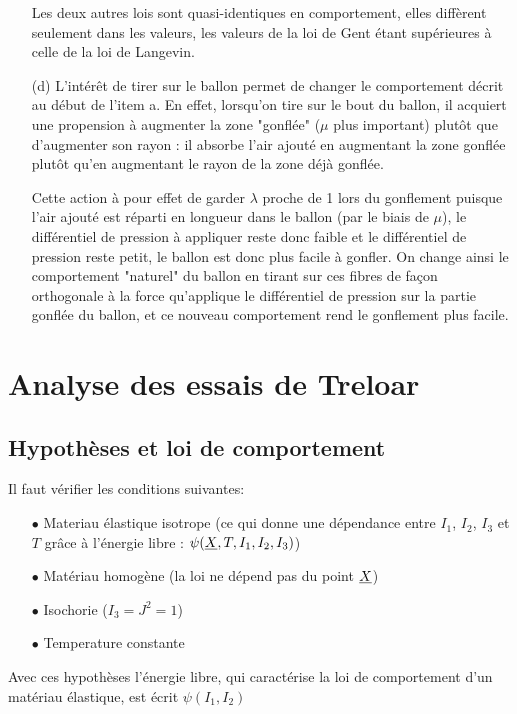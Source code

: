 \documentclass[a4paper,11pt]{article}
\begin{document}
\begin{enumerate}
\hspace{0.8cm}Les deux autres lois sont quasi-identiques en comportement, elles diffèrent seulement dans les valeurs, les valeurs de la loi de Gent étant supérieures à celle de la loi de Langevin.

\item[(d)]
L'intérêt de tirer sur le ballon permet de changer le comportement décrit au début de l'item a. En effet, lorsqu'on tire sur le bout du ballon, il acquiert une propension à augmenter la zone "gonflée" ($\mu$ plus important) plutôt que d'augmenter son rayon : il absorbe l'air ajouté en augmentant la zone gonflée plutôt qu'en augmentant le rayon de la zone déjà gonflée.

\hspace{0.8cm}Cette action à pour effet de garder $\lambda$ proche de 1 lors du gonflement puisque l'air ajouté est réparti en longueur dans le ballon (par le biais de $\mu$), le différentiel de pression à appliquer reste donc faible et le différentiel de pression reste petit, le ballon est donc plus facile à gonfler. On change ainsi le comportement "naturel" du ballon en tirant sur ces fibres de façon orthogonale à la force qu'applique le différentiel de pression sur la partie gonflée du ballon, et ce nouveau comportement rend le gonflement plus facile.
\end{enumerate}

\clearpage


%
%
%
\section{Analyse des essais de Treloar}
\subsection{Hypothèses et loi de comportement}

Il faut vérifier les conditions suivantes:

\begin{itemize}
	\item[$\bullet$] Materiau élastique isotrope (ce qui donne une dépendance entre $I_1$, $I_2$, $I_3$ et $T$ grâce à l'énergie libre : $\displaystyle\psi(\uline{X},T,I_1,I_2,I_3)$)
	\item[$\bullet$] Matériau homogène (la loi ne dépend pas du point $\uline{X}$)
	\item[$\bullet$] Isochorie ($I_3 =J^2=1$)
	\item[$\bullet$] Temperature constante
\end{itemize}
Avec ces hypothèses l'énergie libre, qui caractérise la loi de comportement d'un matériau élastique, est écrit $\psi(I_1,I_2)$
\end{document}
